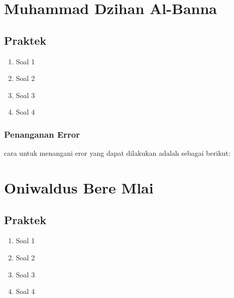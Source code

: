 \section{Muhammad Dzihan Al-Banna}
\subsection{Praktek}
\begin{enumerate}
\item Soal 1


\item Soal 2


\item Soal 3


\item Soal 4


\end{enumerate}

\subsubsection{Penanganan Error}
cara untuk menangani eror yang dapat dilakukan adalah sebagai berikut:




\section{Oniwaldus Bere Mlai}
\subsection{Praktek}
\begin{enumerate}
\item Soal 1


\item Soal 2


\item Soal 3


\item Soal 4


\end{enumerate}

